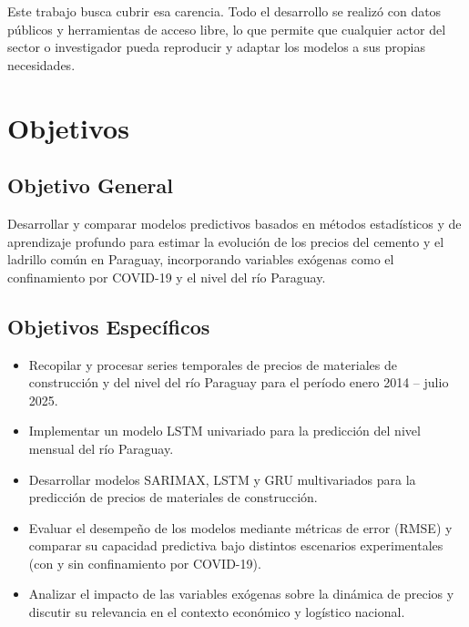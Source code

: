\justify
Este trabajo busca cubrir esa carencia. Todo el desarrollo se realizó con datos públicos y herramientas de acceso libre, lo que permite que cualquier actor del sector o investigador pueda reproducir y adaptar los modelos a sus propias necesidades.

\section{Objetivos}
\subsection{Objetivo General}
\justify
Desarrollar y comparar modelos predictivos basados en métodos estadísticos y de aprendizaje profundo para estimar la evolución de los precios del cemento y el ladrillo común en Paraguay, incorporando variables exógenas como el confinamiento por COVID-19 y el nivel del río Paraguay.

\subsection{Objetivos Específicos}
\begin{itemize}
\item Recopilar y procesar series temporales de precios de materiales de construcción y del nivel del río Paraguay para el período enero 2014 – julio 2025.
\item Implementar un modelo LSTM univariado para la predicción del nivel mensual del río Paraguay.
\item Desarrollar modelos SARIMAX, LSTM y GRU multivariados para la predicción de precios de materiales de construcción.
\item Evaluar el desempeño de los modelos mediante métricas de error (RMSE) y comparar su capacidad predictiva bajo distintos escenarios experimentales (con y sin confinamiento por COVID-19).
\item Analizar el impacto de las variables exógenas sobre la dinámica de precios y discutir su relevancia en el contexto económico y logístico nacional.
\end{itemize}

